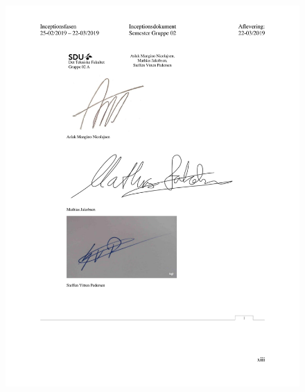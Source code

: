 \begin{figure}[hb]
  \includegraphics[scale = 0.33]{./PNG/Inceptions/Gruppe02+InceptionsDokument-46.jpg} 
\end{figure}

